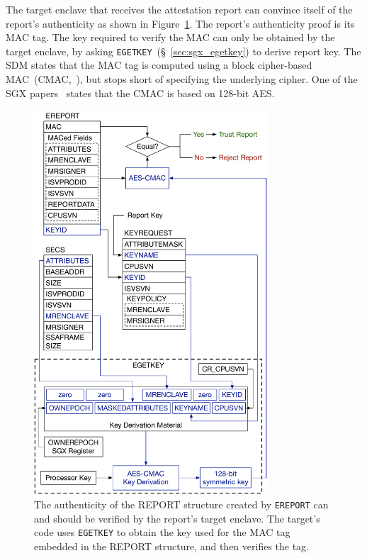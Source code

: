 
The target enclave that receives the attestation report can convince itself of
the report's authenticity as shown in Figure~\ref{fig:sgx_ereport_check}. The
report's authenticity proof is its MAC tag. The key required to verify the MAC
can only be obtained by the target enclave, by asking
\texttt{EGETKEY}~(\S~\ref{sec:sgx_egetkey}) to derive report key. The SDM
states that the MAC tag is computed using a block cipher-based
MAC~(CMAC,~\cite{fips2005cmac}), but stops short of specifying the underlying
cipher. One of the SGX papers~\cite{anati2013sgx} states that the CMAC is based
on 128-bit AES.

\begin{figure}[hbt]
  \centering
  \includegraphics[width=87mm]{figures/sgx_ereport_check.pdf}
  \caption{
    The authenticity of the REPORT structure created by \texttt{EREPORT} can and
    should be verified by the report's target enclave. The target's code uses
    \texttt{EGETKEY} to obtain the key used for the MAC tag embedded in the
    REPORT structure, and then verifies the tag.
  }
  \label{fig:sgx_ereport_check}
\end{figure}

